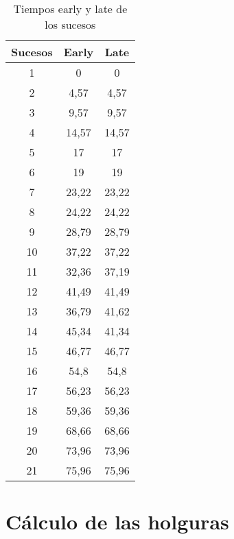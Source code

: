 \documentclass[11pt,a4paper,spanish,twoside]{report}
\begin{document}
{\begin{table}[!h]
\centering
  \begin{tabular}{|c c c|}
    \hline
    \textbf{Sucesos} & \textbf{Early} & \textbf{Late} \\
    \hline \hline
    1 & 0 & 0 \\
    \hline
    2 & 4,57 & 4,57\\
    \hline
    3 & 9,57 & 9,57\\
    \hline
    4 & 14,57 & 14,57\\
    \hline
    5 & 17 & 17\\
    \hline
    6 & 19 & 19\\
    \hline
    7 & 23,22 & 23,22\\
    \hline
    8 & 24,22 & 24,22\\
    \hline
    9 & 28,79 & 28,79\\
    \hline
    10 & 37,22 & 37,22\\
    \hline
    11 & 32,36 & 37,19\\
    \hline
    12 & 41,49 & 41,49\\
    \hline
    13 & 36,79 & 41,62\\
    \hline
    14 & 45,34 & 41,34\\
    \hline
    15 & 46,77 & 46,77\\
    \hline
    16 & 54,8 & 54,8\\
    \hline
    17 & 56,23 & 56,23\\
    \hline
    18 & 59,36 & 59,36\\
    \hline
    19 & 68,66 & 68,66\\
    \hline
    20 & 73,96 & 73,96\\
    \hline
    21 & 75,96 & 75,96\\
    \hline
  \end{tabular}
  \caption{Tiempos early y late de los sucesos}
  \label{Tab:tearly}
\end{table}

\section{Cálculo de las holguras}

}
\end{document}
